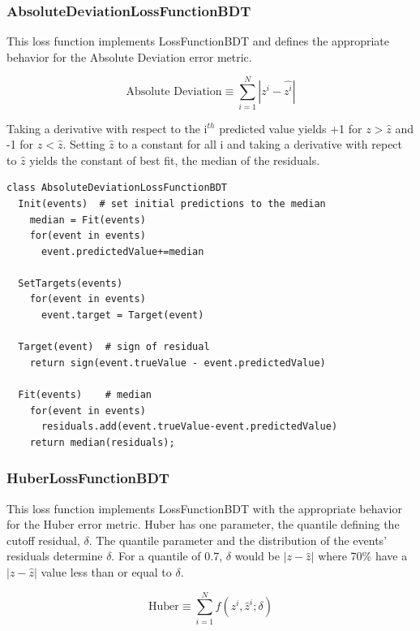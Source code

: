 \documentclass[12pt]{article}
\begin{document}
\subsubsection{AbsoluteDeviationLossFunctionBDT}

This loss function implements LossFunctionBDT and defines the appropriate behavior for the Absolute Deviation error metric.

\begin{equation}
\textrm{Absolute Deviation} \equiv \sum_{i=1}^{N} |z^i-\hat{z^i}|
\end{equation}

Taking a derivative with respect to the i$^{th}$ predicted value yields +1 for $z>\hat{z}$ and -1 for $z<\hat{z}$. Setting $\hat{z}$ to a constant for all i and taking a derivative with repect to $\hat{z}$ yields the constant of best fit, the median of the residuals.    

\begin{verbatim}
class AbsoluteDeviationLossFunctionBDT
  Init(events)  # set initial predictions to the median
    median = Fit(events)
    for(event in events)
      event.predictedValue+=median

  SetTargets(events)  
    for(event in events)  
      event.target = Target(event)

  Target(event)  # sign of residual                 
    return sign(event.trueValue - event.predictedValue)

  Fit(events)    # median                
    for(event in events)
      residuals.add(event.trueValue-event.predictedValue)
    return median(residuals);

\end{verbatim}

\subsubsection{HuberLossFunctionBDT}

This loss function implements LossFunctionBDT with the appropriate behavior for the Huber error metric. Huber has one parameter, the quantile defining the cutoff residual, $\delta$. The quantile parameter and the distribution of the events' residuals determine $\delta$. For a quantile of 0.7, $\delta$ would be $|z-\hat{z}|$ where 70\% have a $|z-\hat{z}|$ value less than or equal to $\delta$.

\begin{equation}
\textrm{Huber} \equiv \sum_{i=1}^{N} f(z^i, \hat{z}^i; \delta)
\end{equation}
\end{document}
